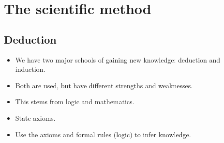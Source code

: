 


\section{The scientific method}

\subsection{Deduction}

\begin{frame}
  \begin{itemize}
    \item We have two major schools of gaining new knowledge: deduction and 
      induction.
    \item Both are used, but have different strengths and weaknesses.
  \end{itemize}
\end{frame}

\begin{frame}
  \begin{definition}[Deduction]
    \begin{itemize}
      \item This stems from logic and mathematics.
      \item State axioms.
      \item Use the axioms and formal rules (logic) to infer knowledge.
    \end{itemize}
  \end{definition}
\end{frame}

